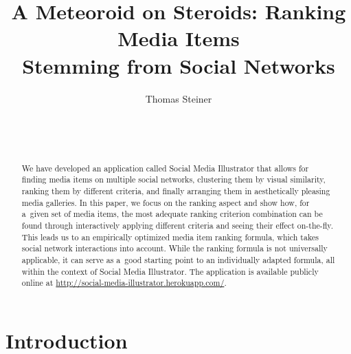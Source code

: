 \documentclass{sig-alternate}
\newcommand{\inlinelistingsize}{\fontsize{8pt}{11pt}}
\let\oldurl\url
\renewcommand{\url}[1]{\inlinelistingsize\oldurl{#1}}
\begin{document}


\title{A Meteoroid on Steroids: Ranking Media Items\\ Stemming from Social Networks}

\author{
\alignauthor
Thomas Steiner\\
	\\
	\\
	\\
}
\maketitle

\begin{abstract}
We have developed an application called Social Media Illustrator
that allows for finding media items on multiple social networks,
clustering them by visual similarity, ranking them by different criteria,
and finally arranging them in aesthetically pleasing media galleries.
In this paper, we focus on the ranking aspect and show how,
for a~given set of media items, the most adequate ranking criterion combination
can be found through interactively applying different criteria
and seeing their effect on-the-fly.
This leads us to an empirically optimized media item ranking formula,
which takes social network interactions into account.
While the ranking formula is not universally applicable,
it can serve as a~good starting point to an individually adapted formula,
all within the context of Social Media Illustrator.
The application is available publicly online at \url{http://social-media-illustrator.herokuapp.com/}.
\end{abstract}



\keywords{}

\section{Introduction}
\end{document}
